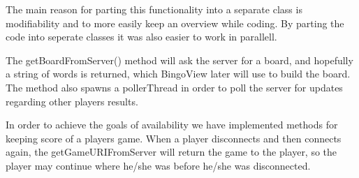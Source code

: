 The main reason for parting this functionality into a separate class is modifiability and to more easily keep an overview while coding. By parting the code into seperate classes it was also easier to work in parallell. 

The getBoardFromServer() method will ask the server for a board, and hopefully a string of words is returned, which BingoView later will use to build the board. The method also spawns a pollerThread in order to poll the server for updates regarding other players results.

In order to achieve the goals of availability we have implemented methods for keeping score of a players game. When a player disconnects and then connects again, the getGameURIFromServer will return the game to the player, so the player may continue where he/she was before he/she was disconnected. 

